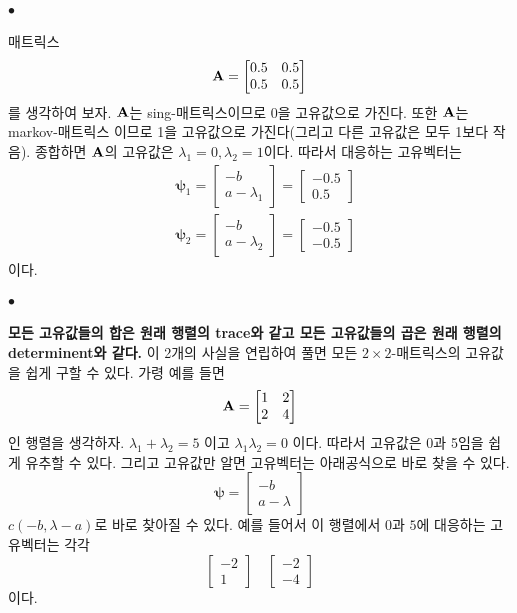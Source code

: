 \documentclass[12pt,oneside,english,a4paper]{article}
\def\ck{\paragraph{\Large$\bullet$}\Large}
\begin{document}
\ck 매트릭스 
\[
{\bf A}=\begin{bmatrix}0.5 & 0.5 \\ 0.5 & 0.5 \end{bmatrix}
\]
를 생각하여 보자. $\bf A$는 sing-매트릭스이므로 0을 고유값으로 가진다. 또한 $\bf A$는 markov-매트릭스 이므로 1을 고유값으로 가진다(그리고 다른 고유값은 모두 1보다 작음). 종합하면 $\bf A$의 고유값은 $\lambda_1=0, \lambda_2=1$이다. 따라서 대응하는 고유벡터는 
\begin{align*}
& \boldsymbol{\psi}_1=\begin{bmatrix} -b \\ a-\lambda_1 \end{bmatrix}=\begin{bmatrix} -0.5 \\ 0.5\end{bmatrix}  \\ 
& \boldsymbol{\psi}_2=\begin{bmatrix} -b \\ a-\lambda_2 \end{bmatrix}=\begin{bmatrix} -0.5 \\ -0.5\end{bmatrix}
\end{align*}
이다. 

\ck \textbf{모든 고유값들의 합은 원래 행렬의 trace와 같고 모든 고유값들의 곱은 원래 행렬의 determinent와 같다.} 이 2개의 사실을 연립하여 풀면 모든 $2 \times 2$-매트릭스의 고유값을 쉽게 구할 수 있다. 가령 예를 들면 
$${\bf A}=\begin{bmatrix} 1 & 2 \\ 2 & 4 \end{bmatrix}$$
인 행렬을 생각하자. $\lambda_1+\lambda_2=5$ 이고 $\lambda_1 \lambda_2=0$ 이다. 따라서 고유값은 0과 5임을 쉽게 유추할 수 있다. 그리고 고유값만 알면 고유벡터는 아래공식으로 바로 찾을 수 있다. 
\[
{\boldsymbol\psi}=\begin{bmatrix}-b \\ a-\lambda \end{bmatrix}
\]
$c(-b,\lambda-a)$로 바로 찾아질 수 있다. 예를 들어서 이 행렬에서 $0$과 $5$에 대응하는 고유벡터는 각각 
\[
\begin{bmatrix}-2 \\ 1\end{bmatrix} \quad \begin{bmatrix}-2 \\ -4\end{bmatrix}
\]
이다. 
\end{document}
